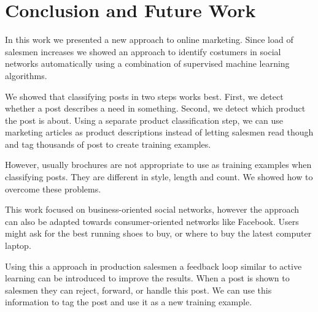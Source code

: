 \section{Conclusion and Future Work}
\label{sec:conclusion}


In this work we presented a new approach to online marketing. Since load of salesmen increases we showed an approach to identify costumers in social networks automatically using a combination of supervised machine learning algorithms.

We showed that classifying posts in two steps works best. 
First, we detect whether a post describes a need in something.
Second, we detect which product the post is about.
Using a separate product classification step, we can use marketing articles as product descriptions instead of letting salesmen read though and tag thousands of post to create training examples.

However, usually brochures are not appropriate to use as training examples when classifying posts.
They are different in style, length and count. 
We showed how to overcome these problems.

This work focused on business-oriented social networks, however the approach can also be adapted towards consumer-oriented networks like Facebook.
Users might ask for the best running shoes to buy, or where to buy the latest computer laptop.

Using this a approach in production salesmen a feedback loop similar to active learning can be introduced to improve the results. When a post is shown to salesmen they can reject, forward, or handle this post. We can use this information to tag the post and use it as a new training example.


